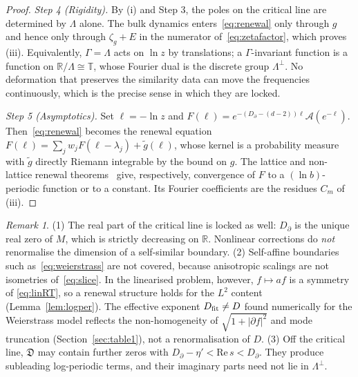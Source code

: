 \documentclass[11pt]{article}
\theoremstyle{definition}\newtheorem{definition}{Definition}[section]
\theoremstyle{remark}\newtheorem*{remark}{Remark}
\newcommand{\cA}{\mathcal{A}}
\newcommand{\cD}{\mathfrak{D}}
\newcommand{\RR}{\mathbb{R}}
\newcommand{\TT}{\mathbb{T}}
\begin{document}
\begin{proof}
\emph{Step 4 (Rigidity).} By (i) and Step 3, the poles on the critical line are determined by $\Lambda$
alone. The bulk dynamics enters~\eqref{eq:renewal} only through $g$ and hence only through
$\zeta_g+E$ in the numerator of~\eqref{eq:zetafactor}, which proves (iii). Equivalently,
$\Gamma=\Lambda$ acts on $\ln z$ by translations; a $\Gamma$-invariant function is a function on
$\RR/\Lambda\cong\TT$, whose Fourier dual is the discrete group $\Lambda^\perp$. No deformation that preserves
the similarity data can move the frequencies continuously, which is the precise sense in which they are
locked.

\emph{Step 5 (Asymptotics).} Set $\ell=-\ln z$ and $F(\ell)=e^{-(D_\partial-(d-2))\ell}\cA(e^{-\ell})$.
Then~\eqref{eq:renewal} becomes the renewal equation
$F(\ell)=\sum_jw_jF(\ell-\lambda_j)+\tilde g(\ell)$, whose kernel is a probability measure with
$\tilde g$ directly Riemann integrable by the bound on $g$. The lattice and non-lattice renewal
theorems~\cite{Feller,Lalley} give, respectively, convergence of $F$ to a $(\ln b)$-periodic function or to
a constant. Its Fourier coefficients are the residues $C_m$ of (iii).
\end{proof}

\begin{remark}
(1) The real part of the critical line is locked as well: $D_\partial$ is the unique real zero of $M$, which
is strictly decreasing on $\RR$. Nonlinear corrections do \emph{not} renormalise the dimension of a
self-similar boundary.
(2) Self-affine boundaries such as~\eqref{eq:weierstrass} are not covered, because anisotropic scalings are
not isometries of~\eqref{eq:slice}. In the linearised problem, however, $f\mapsto af$ is a symmetry of
\eqref{eq:linRT}, so a renewal structure holds for the $L^2$ content (Lemma~\ref{lem:logper}). The effective
exponent $D_{\rm fit}\neq D$ found numerically for the Weierstrass model reflects the non-homogeneity of
$\sqrt{1+|\partial f|^2}$ and mode truncation (Section~\ref{sec:table1}), not a renormalisation of $D$.
(3) Off the critical line, $\cD$ may contain further zeros with $D_\partial-\eta'<\mathrm{Re}\,s<D_\partial$.
They produce subleading log-periodic terms, and their imaginary parts need not lie in $\Lambda^\perp$.
\end{remark}
\end{document}
